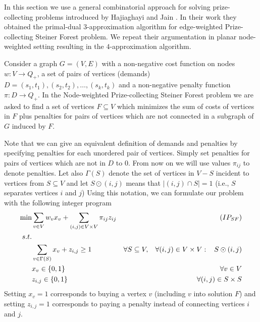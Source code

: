 In this section we use a general combinatorial approach for solving prize-collecting problems introduced by Hajiaghayi and Jain \cite{Hajiaghayi}. In their work they obtained the primal-dual $3$-approximation algorithm for edge-weighted Prize-collecting Steiner Forest problem. We repeat their argumentation in planar node-weighted setting resulting in the $4$-approximation algorithm. 

Consider a graph $G=(V,E)$ with a non-negative cost function on nodes $w : V \rightarrow Q_+$, a set of pairs of vertices (demands) $D = {(s_1,t_1), (s_2,t_2),\dots, (s_k,t_k)}$ and a non-negative penalty function $\pi : D \rightarrow Q_+$. In the Node-weighted Prize-collecting Steiner Forest problem we are asked to find a set of vertices $F\subseteq V$ which minimizes the sum of costs of vertices in $F$ plus penalties for pairs of vertices which are not connected in a subgraph of $G$ induced by $F$.

Note that we can give an equivalent definition of demands and penalties by specifying penalties for each unordered pair of vertices. Simply set penalties for pairs of vertices which are not in $D$ to $0$. From now on we will use values $\pi_{ij}$ to denote penalties. Let also $\Gamma(S)$ denote the set of vertices in $V-S$ incident to vertices from $S \subseteq V$ and let $S \odot (i,j)$ means that $|(i,j)\cap S| = 1$ (i.e., $S$ separates vertices $i$ and $j$)
Using this notation, we can formulate our problem with the following integer program
\begin{align*}
\text{min} & \sum_{v\in V} w_v x_v + \sum_{(i,j)\in V\times V}\pi_{ij}z_{ij} & (IP_{SF})\\
s.t.\\
& \sum_{v\in \Gamma(S)} x_v + z_{i,j} \geq  1			& \forall S \subseteq V, \hspace{3mm} \forall (i,j) \in V \times V : \hspace{3mm} S \odot (i,j) \\
& x_v \in \{0,1\}										& \forall v \in V\\
& z_{i,j} \in \{0,1\}									& \forall (i,j) \in S \times S
\end{align*}
Setting $x_v = 1$ corresponds to buying a vertex $v$ (including $v$ into solution $F$) and setting $z_{i,j} = 1$ corresponds to paying a penalty instead of connecting vertices $i$ and $j$.

